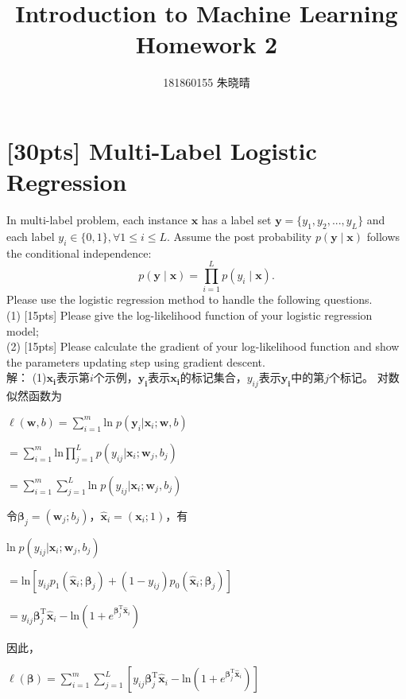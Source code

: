 \documentclass{article}
\title{Introduction to Machine Learning\\Homework 2}
\author{181860155 朱晓晴}
\begin{document}
    \maketitle
	\section{[30pts] Multi-Label Logistic Regression}
    In multi-label problem, each instance $\bm{x}$ has a label set $\bm{y}=\{y_1,y_2,...,y_L\}$ and each label $y_i\in\{0,1\}, \forall 1 \leq i \leq L$. Assume the post probability $p(\bm{y} \mid \bm{x})$ follows the conditional independence:\\
    \begin{equation}
    p(\bm{y} \mid \bm{x})=\prod\limits_{i=1}^L p(y_i \mid \bm{x}).
    \end{equation}
    Please use the logistic regression method to handle the following questions.\\
    (1) [15pts] Please give the log-likelihood function of your logistic regression model;\\
    (2) [15pts] Please calculate the gradient of your log-likelihood function and show the parameters updating step using gradient descent.\\

解：
(1)$\bm{x_i}$表示第$i$个示例，$\bm{y_i}$表示$\bm{x_i}$的标记集合，$y_{ij}$表示$\bm{y_i}$中的第$j$个标记。
对数似然函数为
\begin{spacing}{2.0}
$\ell(\bm{w},b)=\sum\limits_{i=1}^m\text{ln}\; p(\bm{y}_i|\bm{x}_i;\bm{w},b)$

$=\sum\limits_{i=1}^m \text{ln} \prod\limits_{j=1}^L p(y_{ij}|\bm{x}_i;\bm{w}_j,b_j)$

$=\sum\limits_{i=1}^m\sum\limits_{j=1}^L \text{ln}\; p(y_{ij}|\bm{x}_i;\bm{w}_j,b_j)$
\end{spacing}

令$\bm{\beta}_j=(\bm{w}_j;b_j)$，$\bm{\hat{x}}_i=(\bm{x}_i;1)$，有
\begin{spacing}{2.0}
$\text{ln}\; p(y_{ij}|\bm{x}_i;\bm{w}_j,b_j)$

$=\text{ln}[y_{ij}p_1(\bm{\hat{x}}_i;\bm{\beta}_j)+(1-y_{ij})p_0(\bm{\hat{x}}_i;\bm{\beta}_j)]$

$=y_{ij}\bm{\beta}_j^\mathrm{T}\bm{\hat{x}}_i-\text{ln}(1+e^{\bm{\beta}_j^\mathrm{T}\bm{\hat{x}}_i})$
\end{spacing}

因此，

$\ell(\bm{\beta})
=\sum\limits_{i=1}^m\sum\limits_{j=1}^L[y_{ij}\bm{\beta}_j^\mathrm{T}\bm{\hat{x}}_i-\text{ln}(1+e^{\bm{\beta}_j^\mathrm{T}\bm{\hat{x}}_i})]$
\\
\end{document}
